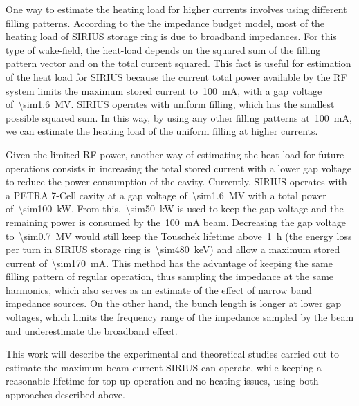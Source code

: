 \documentclass
[
    a4paper,
    nospread,     %
]{jacow}
\begin{document}
    One way to estimate the heating load for higher currents involves using different filling patterns. According to the the impedance budget model, most of the heating load of SIRIUS storage ring is due to broadband impedances. For this type of wake-field, the heat-load depends on the squared sum of the filling pattern vector and on the total current squared. This fact is useful for estimation of the heat load for SIRIUS because the current total power available by the RF system limits the maximum stored current to~\SI{100}{\milli\ampere}, with a gap voltage of~\SI{\sim1.6}{\mega\volt}. SIRIUS operates with uniform filling, which has the smallest possible squared sum. In this way, by using any other filling patterns at~\SI{100}{\milli\ampere}, we can estimate the heating load of the uniform filling at higher currents.

    Given the limited RF power, another way of estimating the heat-load for future operations consists in increasing the total stored current with a lower gap voltage to reduce the power consumption of the cavity. Currently, SIRIUS operates with a PETRA 7-Cell cavity at a gap voltage of~\SI{\sim1.6}{\mega\volt} with a total power of~\SI{\sim100}{\kilo\watt}. From this,~\SI{\sim50}{\kilo\watt} is used to keep the gap voltage and the remaining power is consumed by the~\SI{100}{\milli\ampere} beam. Decreasing the gap voltage to~\SI{\sim0.7}{\mega\volt} would still keep the Touschek lifetime above~\SI{1}{\hour} (the energy loss per turn in SIRIUS storage ring is~\SI{\sim480}{\kilo\electronvolt}) and allow a maximum stored current of~\SI{\sim170}{\milli\ampere}. This method has the advantage of keeping the same filling pattern of regular operation, thus sampling the impedance at the same harmonics, which also serves as an estimate of the effect of narrow band impedance sources. On the other hand, the bunch length is longer at lower gap voltages, which limits the frequency range of the impedance sampled by the beam and underestimate the broadband effect. 

    This work will describe the experimental and theoretical studies carried out to estimate the maximum beam current SIRIUS can operate, while keeping a reasonable lifetime for top-up operation and no heating issues, using both approaches described above.
\end{document}
